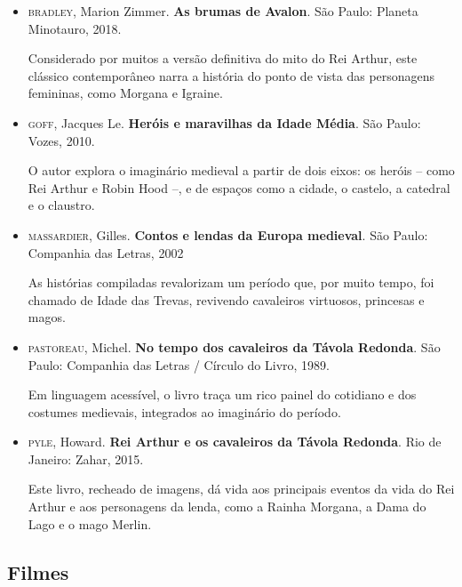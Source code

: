 \documentclass[11pt]{extarticle}
\begin{document}
\begin{itemize}
\item\textsc{bradley}, Marion Zimmer. \textbf{As brumas de Avalon}. São Paulo: Planeta Minotauro, 2018.

  Considerado por muitos a versão definitiva do mito do Rei Arthur, este
  clássico contemporâneo narra a história do ponto de vista das
  personagens femininas, como Morgana e Igraine.

\item\textsc{goff}, Jacques Le. \textbf{Heróis e maravilhas da Idade Média}. São
Paulo: Vozes, 2010.

  O autor explora o imaginário medieval a partir de dois eixos: os
  heróis -- como Rei Arthur e Robin Hood --, e de espaços como a cidade,
  o castelo, a catedral e o claustro.

\item\textsc{massardier}, Gilles. \textbf{Contos e lendas da Europa medieval}. São
Paulo: Companhia das Letras, 2002

  As histórias compiladas revalorizam um período que, por muito tempo,
  foi chamado de Idade das Trevas, revivendo cavaleiros virtuosos,
  princesas e magos.

\item\textsc{pastoreau}, Michel. \textbf{No tempo dos cavaleiros da Távola Redonda}. São Paulo: Companhia das Letras / Círculo do Livro, 1989.

  Em linguagem acessível, o livro traça um rico painel do cotidiano e
  dos costumes medievais, integrados ao imaginário do período.

\item\textsc{pyle}, Howard. \textbf{Rei Arthur e os cavaleiros da Távola Redonda}. Rio de Janeiro: Zahar, 2015.

  Este livro, recheado de imagens, dá vida aos principais eventos da
  vida do Rei Arthur e aos personagens da lenda, como a Rainha Morgana,
  a Dama do Lago e o mago Merlin.
\end{itemize}

\subsection{Filmes}
\end{document}
